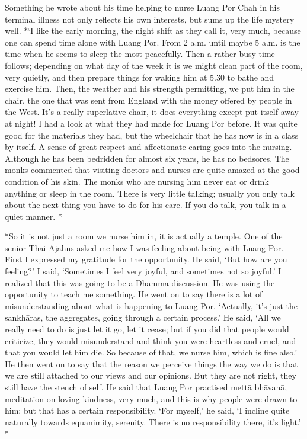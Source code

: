 Something he wrote about his time helping to nurse Luang Por Chah in his
terminal illness not only reflects his own interests, but sums up the
life mystery well. *`I like the early morning, the night shift as they
call it, very much, because one can spend time alone with Luang Por.
From 2 a.m. until maybe 5 a.m. is the time when he seems to sleep the
most peacefully. Then a rather busy time follows; depending on what day
of the week it is we might clean part of the room, very quietly, and
then prepare things for waking him at 5.30 to bathe and exercise him.
Then, the weather and his strength permitting, we put him in the chair,
the one that was sent from England with the money offered by people in
the West. It's a really superlative chair, it does everything except put
itself away at night! I had a look at what they had made for Luang Por
before. It was quite good for the materials they had, but the wheelchair
that he has now is in a class by itself. A sense of great respect and
affectionate caring goes into the nursing. Although he has been
bedridden for almost six years, he has no bedsores. The monks commented
that visiting doctors and nurses are quite amazed at the good condition
of his skin. The monks who are nursing him never eat or drink anything
or sleep in the room. There is very little talking; usually you only
talk about the next thing you have to do for his care. If you do talk,
you talk in a quiet manner. *

*So it is not just a room we nurse him in, it is actually a temple. One
of the senior Thai Ajahns asked me how I was feeling about being with
Luang Por. First I expressed my gratitude for the opportunity. He said,
`But how are you feeling?' I said, `Sometimes I feel very joyful, and
sometimes not so joyful.' I realized that this was going to be a Dhamma
discussion. He was using the opportunity to teach me something. He went
on to say there is a lot of misunderstanding about what is happening to
Luang Por. `Actually, it's just the sankhāras, the aggregates, going
through a certain process.' He said, `All we really need to do is just
let it go, let it cease; but if you did that people would criticize,
they would misunderstand and think you were heartless and cruel, and
that you would let him die. So because of that, we nurse him, which is
fine also.' He then went on to say that the reason we perceive things
the way we do is that we are still attached to our views and our
opinions. But they are not right, they still have the stench of self. He
said that Luang Por practised mettā bhāvanā, meditation on
loving-kindness, very much, and this is why people were drawn to him;
but that has a certain responsibility. `For myself,' he said, `I incline
quite naturally towards equanimity, serenity. There is no responsibility
there, it's light.' *


